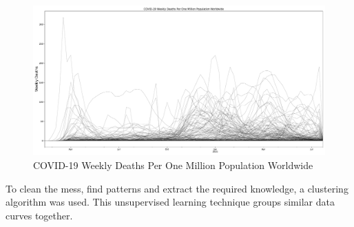 \documentclass[11pt,a4paper]{article}
\begin{document}
\begin{figure}[H]
    \begin{center}
        \hspace*{-0.3cm}
        \includegraphics[scale=0.32]{img/weekly-deaths-worldwide.pdf}
    \end{center}
    \vspace{-0.3cm}
    \caption{COVID-19 Weekly Deaths Per One Million Population Worldwide}
\end{figure}
\noindent
To clean the mess, find patterns and extract the required knowledge, a
clustering algorithm was used. This unsupervised learning technique groups
similar data curves together.
\end{document}
